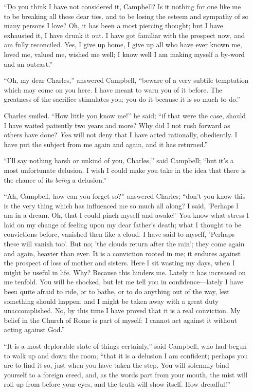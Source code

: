 ``Do you think I have not considered it, Campbell? Is it
nothing for one like me to be breaking all these dear ties, and to be
losing the esteem and sympathy of so many persons I love? Oh, it has
been a most piercing thought; but I have exhausted it, I have drunk it
out. I have got familiar with the prospect now, and am fully
reconciled. Yes, I give up home, I give up all who have ever known me,
loved me, valued me, wished me well; I know well I am making
myself a by-word and an outcast.''

``Oh, my dear Charles,'' answered Campbell, ``beware of
a very subtile temptation which may come on you here. I have meant to
warn you of it before. The greatness of the sacrifice stimulates you;
you do it because it is so much to do.''

Charles smiled. ``How little you know me!'' he said;
``if that were the case, should I have waited patiently two years
and more? Why did I not rush forward as others have done? \emph{You}
will not deny that I have acted rationally, obediently. I have put the
subject from me again and again, and it has returned.''

``I'll say nothing harsh or unkind of you, Charles,'' said
Campbell; ``but it's a most unfortunate delusion. I wish I could
make you take in the idea that there is the chance of its \emph{being}
a delusion.''

``Ah, Campbell, how can you forget so?'' answered Charles;
``don't you know this is the very thing which has influenced me so
much all along? I said, 'Perhaps I am in a dream. Oh, that I could
pinch myself and awake!' You know what stress I laid on my change of
feeling upon my dear father's death; what I thought to be convictions
before, vanished then like a cloud. I have said to myself, 'Perhaps
these will vanish too'. But no; 'the clouds return after the rain';
they come again and again, heavier than ever. It is a conviction
rooted in me; it endures against the prospect of loss of mother and
sisters. Here I sit wasting my days, when I might be useful in life.
Why? Because this hinders me. Lately it has increased on me tenfold.
You will be shocked, but let me tell you in confidence—lately
I have been quite afraid to ride, or to bathe, or to do anything out
of the way, lest something should happen, and I might be taken away
with a great duty unaccomplished. No, by this time I have proved that
it is a real conviction. My belief in the Church of Rome is part of
myself: I cannot act against it without acting against God.''

``It is a most deplorable state of things certainly,'' said
Campbell, who had begun to walk up and down the room; ``that it is
a delusion I am confident; perhaps you are to find it so, just when
you have taken the step. You will solemnly bind yourself to a foreign
creed, and, as the words part from your mouth, the mist will roll up
from before your eyes, and the truth will show itself. How
dreadful!''

